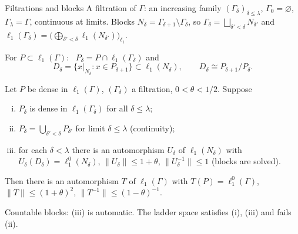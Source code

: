 \documentclass[10pt,aspectratio=169]{beamer}
\newcommand{\lo}[1]{\ell_1^0(#1)}
\newcommand{\ellone}[1]{\ell_1(#1)}
\begin{document}
\begin{frame}{Filtrations and blocks}
  A \alert{filtration} of $\Gamma$: an increasing family ${(\Gamma_\delta)}_{\delta\le\lambda}$,
  $\Gamma_0=\varnothing$, $\Gamma_\lambda=\Gamma$, continuous at limits.
  Blocks $N_\delta=\Gamma_{\delta+1}\setminus\Gamma_\delta$, so
  $\Gamma_\delta=\bigsqcup_{\delta'<\delta}N_{\delta'}$ and
  $\ellone{\Gamma_\delta}=\bigl(\bigoplus_{\delta'<\delta}\ellone{N_{\delta'}}\bigr)_{\ell_1}$.
  \medskip

  For $P\subset\ellone\Gamma$: \ $P_\delta=P\cap\ellone{\Gamma_\delta}$ and
  \[
    D_\delta=\{x|_{N_\delta}:x\in P_{\delta+1}\}\subset\ellone{N_\delta},
    \qquad D_\delta\cong P_{\delta+1}/P_\delta .
  \]
  \begin{theorem}
    Let $P$ be dense in $\ellone\Gamma$, ${(\Gamma_\delta)}$ a filtration, $0<\theta<1/2$. Suppose
    \begin{enumerate}[(i)]
      \item $P_\delta$ is dense in $\ellone{\Gamma_\delta}$ for all $\delta\le\lambda$;
      \item $P_\delta=\bigcup_{\delta'<\delta}P_{\delta'}$ for limit $\delta\le\lambda$ \hfill (continuity);
      \item for each $\delta<\lambda$ there is an automorphism $U_\delta$ of
        $\ellone{N_\delta}$ with $U_\delta(D_\delta)=\lo{N_\delta}$,
        $\|U_\delta\|\le1+\theta$, $\|U_\delta^{-1}\|\le1$ \hfill (blocks are solved).
    \end{enumerate}
    Then there is an automorphism $T$ of $\ellone\Gamma$ with $T(P)=\lo\Gamma$,
    $\|T\|\le{(1+\theta)}^2$, $\|T^{-1}\|\le{(1-\theta)}^{-1}$.
  \end{theorem}
  Countable blocks: (iii) is automatic. The ladder space satisfies (i), (iii)
  and fails (ii).
\end{frame}
\end{document}

